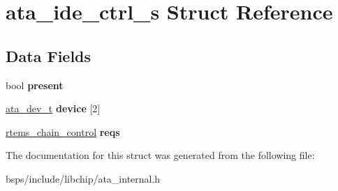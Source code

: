 \hypertarget{structata__ide__ctrl__s}{}\section{ata\+\_\+ide\+\_\+ctrl\+\_\+s Struct Reference}
\label{structata__ide__ctrl__s}
\subsection*{Data Fields}
\begin{DoxyCompactItemize}
\item 
\mbox{\label{structata__ide__ctrl__s_ad4e9510f9b3b628268850feabf02e7a6}} 
bool {\bfseries present}
\item 
\mbox{\label{structata__ide__ctrl__s_afba96ca9d6447f35ba35e1aee2b887c3}} 
\mbox{\hyperlink{structata__dev__s}{ata\+\_\+dev\+\_\+t}} {\bfseries device} \mbox{[}2\mbox{]}
\item 
\mbox{\label{structata__ide__ctrl__s_a6639a099dc9cde06e6a1bf5479c411d3}} 
\mbox{\hyperlink{unionChain__Control}{rtems\+\_\+chain\+\_\+control}} {\bfseries reqs}
\end{DoxyCompactItemize}


The documentation for this struct was generated from the following file\+:\begin{DoxyCompactItemize}
\item 
bsps/include/libchip/ata\+\_\+internal.\+h\end{DoxyCompactItemize}
